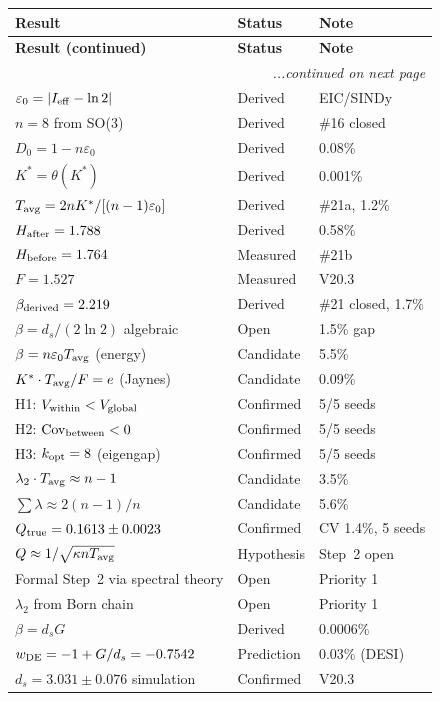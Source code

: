 \documentclass[12pt, a4paper]{article}
\begin{document}
{\renewcommand{\arraystretch}{1.5}
\begin{longtable}{p{6cm}p{2.6cm}p{4cm}}
\toprule
\textbf{Result} & \textbf{Status} & \textbf{Note}\\
\midrule
\endfirsthead
\toprule
\textbf{Result (continued)} & \textbf{Status} & \textbf{Note}\\
\midrule
\endhead
\midrule
\multicolumn{3}{r}{\emph{...continued on next page}} \\
\endfoot
\bottomrule
\endlastfoot
$\varepsilon_0=|I_{\rm eff}-\ln 2|$ & Derived & EIC/SINDy\\
$n=8$ from SO(3) & Derived & \#16 closed\\
$D_0=1-n\varepsilon_0$ & Derived & 0.08\%\\
$K^*=\theta(K^*)$ & Derived & 0.001\%\\
$T_{\rm avg}=2nK^*/[(n-1)\varepsilon_0]$ & Derived & \#21a, 1.2\%\\
$H_{\rm after}=1.788$ & Derived & 0.58\%\\
$H_{\rm before}=1.764$ & Measured & \#21b\\
$F=1.527$ & Measured & V20.3\\
$\beta_{\rm derived}=2.219$ & Derived & \#21 closed, 1.7\%\\
$\beta=d_s/(2\ln 2)$ algebraic & Open & 1.5\% gap\\
$\beta=n\varepsilon_0 T_{\rm avg}$ (energy) & Candidate & 5.5\%\\
$K^*\cdot T_{\rm avg}/F=e$ (Jaynes) & Candidate & 0.09\%\\
H1: $V_{\rm within}<V_{\rm global}$ & Confirmed & 5/5 seeds\\
H2: $\mathrm{Cov}_{\rm between}<0$ & Confirmed & 5/5 seeds\\
H3: $k_{\rm opt}=8$ (eigengap) & Confirmed & 5/5 seeds\\
$\lambda_2\cdot T_{\rm avg}\approx n-1$ & Candidate & 3.5\%\\
$\sum\lambda\approx 2(n-1)/n$ & Candidate & 5.6\%\\
$Q_{\rm true}=0.1613\pm 0.0023$ & Confirmed & CV 1.4\%, 5 seeds\\
$Q\approx 1/\sqrt{\kappa n T_{\rm avg}}$ & Hypothesis & Step~2 open\\
Formal Step~2 via spectral theory & Open & Priority 1\\
$\lambda_2$ from Born chain & Open & Priority 1\\
$\beta=d_s G$ & Derived & 0.0006\%\\
$w_{\rm DE}=-1+G/d_s=-0.7542$ & Prediction & 0.03\% (DESI)\\
$d_s=3.031\pm 0.076$ simulation & Confirmed & V20.3\\
\end{longtable}
\vspace{-\parskip}
}
\end{document}
